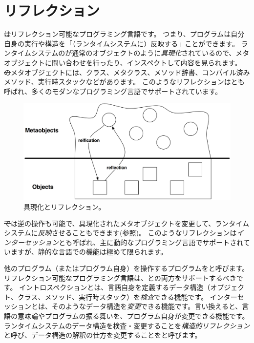 \documentclass[a4paper,10pt,twoside]{book}
\begin{document}
	\renewcommand{\nnbb}[2]{} %
	\sloppy
\fi

\chapter{リフレクション}


\st はリフレクション可能なプログラミング言語です。
つまり、プログラムは自分自身の実行や構造を「（ランタイムシステムに）反映する」ことができます。
ランタイムシステムのが通常のオブジェクトのように\emph{具現化}されているので、メタオブジェクトに問い合わせを行ったり、インスペクトして内容を見られます。
\st のメタオブジェクトには、クラス、メタクラス、メソッド辞書、コンパイル済みメソッド、実行時スタックなどがあります。
このようなリフレクションはとも呼ばれ、多くのモダンなプログラミング言語でサポートされています。

\begin{figure}[ht]\centering
	\includegraphics[width=\linewidth]{reflect}
	\caption{具現化とリフレクション。} %
\end{figure}

\st では逆の操作も可能で、具現化されたメタオブジェクトを変更して、ランタイムシステムに\emph{反映}させることもできます(参照)。
このようなリフレクションは\emph{インターセッション}とも呼ばれ、主に動的なプログラミング言語でサポートされていますが、静的な言語での機能は極めて限られます。

他のプログラム（またはプログラム自身）を操作するプログラムをと呼びます。
リフレクション可能なプログラミング言語は、との両方をサポートするべきです。
イントロスペクションとは、言語自身を定義するデータ構造（オブジェクト、クラス、メソッド、実行時スタック）を\emph{検査}できる機能です。
インターセッションとは、そのようなデータ構造を\emph{変更}できる機能です。言い換えると、言語の意味論やプログラムの振る舞いを、プログラム自身が変更できる機能です。
ランタイムシステムのデータ構造を検査・変更することを\emph{構造的リフレクション}と呼び、データ構造の解釈の仕方を変更することをと呼びます。
\end{document}
